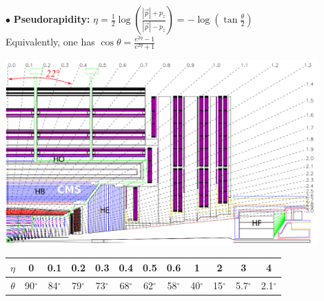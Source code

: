 \documentclass[9pt,a4paper,unknownkeysallowed,xcolor=dvipsnames,aspectratio=43]{beamer}
\begin{document}
\begin{frame}



{\color{darkred}\Large$\bullet$} {\bf Pseudorapidity:}
$
\eta=\frac{1}{2}\log\left(\frac{|\vec{p}|+p_z}{|\vec{p}|-p_z}\right)=-\log\left(\tan\frac{\theta}{2}\right)
$\\\vspace{2mm}
Equivalently, one has
$
\cos\theta=\frac{e^{2\eta}-1}{e^{2\eta} + 1}$

\begin{center}
\includegraphics[width=0.9\textwidth]{eta.png}\\
\vspace{2mm}
\begin{tabular}{ |c| c c c c c c c c c c c|}
\hline\hline
 $\eta$ & 0 & 0.1 & 0.2 & 0.3 & 0.4 & 0.5 & 0.6 & 1 & 2 & 3 & 4 \\ 
 \hline
 $\theta$ & 90$^\circ$ & 84$^\circ$ & 79$^\circ$ & 73$^\circ$ & 68$^\circ$ &
       62$^\circ$ & 58$^\circ$ & 40$^\circ$ & 15$^\circ$ &  5.7$^\circ$ &
        2.1$^\circ$\\
 \hline
\end{tabular}
\end{center}
\end{frame}
%
%
\end{document}
